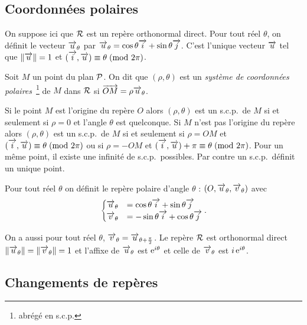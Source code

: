 \subsection{Coordonnées polaires}
\label{subsec:coordpol}
  On suppose ici que \(\Rep\) est un repère orthonormal direct. Pour tout réel \(\theta\), on définit le vecteur \(\vu_\theta\) par \(\vu_\theta=\cos\theta\vi+\sin\theta\vj\). C'est l'unique vecteur \(\vu\) tel que \(\norme{\vu}=1\) et \(\congru{(\vi,\vu)}{\theta}{2\pi}\).
\begin{defdef}
  Soit \(M\) un point du plan \(\P\). On dit que \((\rho,\theta)\) est un \emph{système de coordonnées polaires}~\footnote{abrégé en s.c.p.} de \(M\) dans \(\Rep\) si \(\vect{OM}=\rho\vu_\theta\).
\end{defdef}
%
Si le point \(M\) est l'origine du repère \(O\) alors \((\rho,\theta)\) est un s.c.p.\ de \(M\) si et seulement si \(\rho=0\) et l'angle \(\theta\) est quelconque. Si \(M\) n'est pas l'origine du repère alors \((\rho,\theta)\) est un s.c.p.\ de \(M\) si et seulement si \(\rho=OM\) et \(\congru{(\vi,\vu)}{\theta}{2\pi}\) ou si \(\rho=-OM\) et \(\congru{(\vi,\vu)+\pi}{\theta}{2\pi}\). Pour un même point, il existe une infinité de s.c.p.\ possibles. Par contre un s.c.p.\ définit un unique point.
% 
\begin{defdef}
  Pour tout réel \(\theta\) on définit le repère polaire d'angle \(\theta\) : \((O, \vu_\theta, \vv_\theta)\) avec 
  \begin{equation}
    \begin{cases} 
      \vu_\theta&=\cos \theta \vi + \sin \theta \vj \\ 
      \vv_\theta&=-\sin \theta \vi + \cos \theta \vj
    \end{cases}.
  \end{equation}
\end{defdef}

On a aussi pour tout réel \(\theta\), \(\vv_\theta=\vu_{\theta+\frac{\pi}{2}}\). Le repère \(\Rep\) est orthonormal direct \(\norme{\vu_\theta}=\norme{\vv_\theta}=1\) et l'affixe de \(\vu_\theta\) est \(\e^{i \theta}\) et celle de \(\vv_\theta\) est \(i \e^{i \theta}\). %
%
\subsection{Changements de repères}
\label{subsec:changementsderepere}
